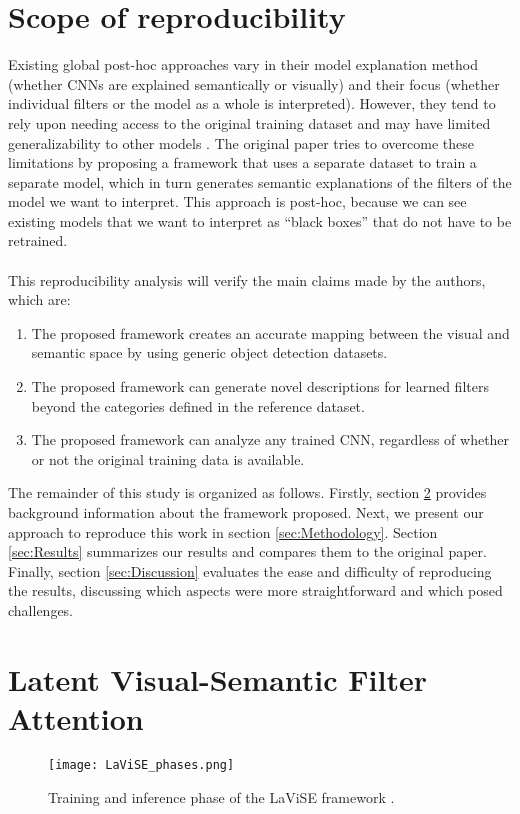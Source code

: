 \section{Scope of reproducibility} \label{sec:Scope of reproducibility}
Existing global post-hoc approaches vary in their model explanation method (whether CNNs are explained semantically or visually) and their focus (whether individual filters or the model as a whole is interpreted). However, they tend to rely upon needing access to the original training dataset and may have limited generalizability to other models \cite{park2018multimodal}. The original paper tries to overcome these limitations by proposing a framework that uses a separate dataset to train a separate model, which in turn generates semantic explanations of the filters of the model we want to interpret. This approach is post-hoc, because we can see existing models that we want to interpret as ``black boxes'' that do not have to be retrained.
\\\\
This reproducibility analysis will verify the main claims made by the authors, which are:
\begin{enumerate}
    \item The proposed framework creates an accurate mapping between the visual and semantic space by using generic object detection datasets.
    \item The proposed framework can generate novel descriptions for learned filters beyond the categories defined in the reference dataset.
    \item The proposed framework can analyze any trained CNN, regardless of whether or not the original training data is available.
\end{enumerate}

The remainder of this study is organized as follows. Firstly, section \ref{sec:Latent Visual-Semantic Filter Attention} provides background information about the framework proposed. Next, we present our approach to reproduce this work in section \ref{sec:Methodology}. Section \ref{sec:Results} summarizes our results and compares them to the original paper. Finally, section \ref{sec:Discussion} evaluates the ease and difficulty of reproducing the results, discussing which aspects were more straightforward and which posed challenges.


\section{Latent Visual-Semantic Filter Attention} \label{sec:Latent Visual-Semantic Filter Attention}
\begin{figure}[b!]
    \centering
    \texttt{[image: LaViSE\_phases.png]}
    \caption{Training and inference phase of the LaViSE framework \cite{yang2022explaining}.}
    \label{fig:LaViSE_phases}
\end{figure}

